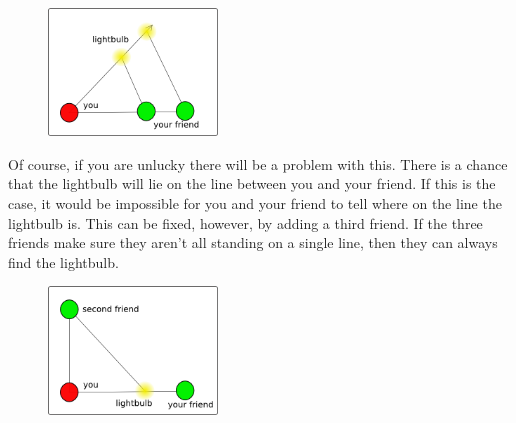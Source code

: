 	\begin{figure}[H]
	\centering
	\includegraphics[width=0.4\textwidth]{../sections/seasons/season1/110/images/drawing2.png} 
	\end{figure}


Of course, if you are unlucky there will be a problem with this. There is a chance that the lightbulb will lie on the line between you and your friend. If this is the case, it would be impossible for you and your friend to tell where on the line the lightbulb is. This can be fixed, however, by adding a third friend. If the three friends make sure they aren't all standing on a single line, then they can always find the lightbulb.


	\begin{figure}[H]
	\centering
	\includegraphics[width=0.4\textwidth]{../sections/seasons/season1/110/images/drawing3.png} 
	\end{figure}


